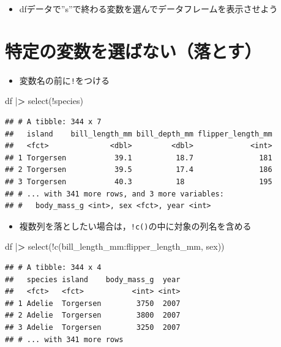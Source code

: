 \documentclass[
  xelatex,ja=standard, b5paper]{bxjsbook}
\newenvironment{Shaded}{\begin{snugshade}}{\end{snugshade}}
\newcommand{\ErrorTok}[1]{\textcolor[rgb]{0.64,0.00,0.00}{\textbf{#1}}}
\newcommand{\FunctionTok}[1]{\textcolor[rgb]{0.00,0.00,0.00}{#1}}
\newcommand{\NormalTok}[1]{#1}
\newcommand{\SpecialCharTok}[1]{\textcolor[rgb]{0.00,0.00,0.00}{#1}}
\providecommand{\tightlist}{%
  \setlength{\itemsep}{0pt}\setlength{\parskip}{0pt}}
\begin{document}
\begin{itemize}
\tightlist
\item
  dfデータで''s''で終わる変数を選んでデータフレームを表示させよう
\end{itemize}

\hypertarget{select-drop}{%
\section{特定の変数を選ばない（落とす）}\label{select-drop}}

\begin{itemize}
\tightlist
\item
  変数名の前に\texttt{!}をつける
\end{itemize}

\begin{Shaded}
\begin{Highlighting}[]
\NormalTok{df }\SpecialCharTok{|}\ErrorTok{\textgreater{}} 
  \FunctionTok{select}\NormalTok{(}\SpecialCharTok{!}\NormalTok{species)}
\end{Highlighting}
\end{Shaded}

\begin{verbatim}
## # A tibble: 344 x 7
##   island    bill_length_mm bill_depth_mm flipper_length_mm
##   <fct>              <dbl>         <dbl>             <int>
## 1 Torgersen           39.1          18.7               181
## 2 Torgersen           39.5          17.4               186
## 3 Torgersen           40.3          18                 195
## # ... with 341 more rows, and 3 more variables:
## #   body_mass_g <int>, sex <fct>, year <int>
\end{verbatim}

\begin{itemize}
\tightlist
\item
  複数列を落としたい場合は，\texttt{!c()}の中に対象の列名を含める
\end{itemize}

\begin{Shaded}
\begin{Highlighting}[]
\NormalTok{df }\SpecialCharTok{|}\ErrorTok{\textgreater{}} 
  \FunctionTok{select}\NormalTok{(}\SpecialCharTok{!}\FunctionTok{c}\NormalTok{(bill\_length\_mm}\SpecialCharTok{:}\NormalTok{flipper\_length\_mm, sex))}
\end{Highlighting}
\end{Shaded}

\begin{verbatim}
## # A tibble: 344 x 4
##   species island    body_mass_g  year
##   <fct>   <fct>           <int> <int>
## 1 Adelie  Torgersen        3750  2007
## 2 Adelie  Torgersen        3800  2007
## 3 Adelie  Torgersen        3250  2007
## # ... with 341 more rows
\end{verbatim}
\end{document}
